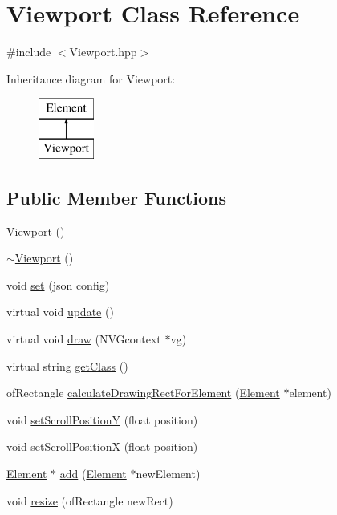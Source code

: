 \hypertarget{class_viewport}{}\section{Viewport Class Reference}
\label{class_viewport}


{\ttfamily \#include $<$Viewport.\+hpp$>$}

Inheritance diagram for Viewport\+:\begin{figure}[H]
\begin{center}
\leavevmode
\includegraphics[height=2.000000cm]{class_viewport}
\end{center}
\end{figure}
\subsection*{Public Member Functions}
\begin{DoxyCompactItemize}
\item 
\hyperlink{class_viewport_a9fde8f966d9802dd42254acf0ed05386}{Viewport} ()
\item 
\hyperlink{class_viewport_a1e18a1ff4a52be33ef63d25034561850}{$\sim$\+Viewport} ()
\item 
void \hyperlink{class_viewport_a96703fae50a7a103da0a576c55fbdea5}{set} (json config)
\item 
virtual void \hyperlink{class_viewport_a7997e0e684a4f8b5709f4d98be6cebb4}{update} ()
\item 
virtual void \hyperlink{class_viewport_a89204037b4982e95495ffb239e9974fc}{draw} (N\+V\+Gcontext $\ast$vg)
\item 
virtual string \hyperlink{class_viewport_adef77198ff36001558b7a29247cedc90}{get\+Class} ()
\item 
of\+Rectangle \hyperlink{class_viewport_a2b7530dfc9d4df664f3874c8ec17d86e}{calculate\+Drawing\+Rect\+For\+Element} (\hyperlink{class_element}{Element} $\ast$element)
\item 
void \hyperlink{class_viewport_a48a9793ff0b244d0618355a32176c459}{set\+Scroll\+PositionY} (float position)
\item 
void \hyperlink{class_viewport_a6343db7258b534ee48e144f94af35e6e}{set\+Scroll\+PositionX} (float position)
\item 
\hyperlink{class_element}{Element} $\ast$ \hyperlink{class_viewport_a91661e99e68106bb29cf20807c5a167c}{add} (\hyperlink{class_element}{Element} $\ast$new\+Element)
\item 
void \hyperlink{class_viewport_a7c8543f8de21b83de2d850c3597d40ec}{resize} (of\+Rectangle new\+Rect)
\end{DoxyCompactItemize}
